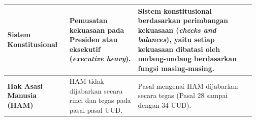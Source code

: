 \begin{table}[h!]
\begin{tabular}{|p{3cm}|p{6cm}|p{6cm}|}
\textbf{Sistem Konstitusional} & Pemusatan kekuasaan pada Presiden atau eksekutif (\textit{executive heavy}). & Sistem konstitusional berdasarkan perimbangan kekuasaan (\textit{checks and balances}), yaitu setiap kekuasaan dibatasi oleh undang-undang berdasarkan fungsi masing-masing. \\ \hline
\textbf{Hak Asasi Manusia (HAM)} & HAM tidak dijabarkan secara rinci dan tegas pada pasal-pasal UUD. & Pasal mengenai HAM dijabarkan secara tegas (Pasal 28 sampai dengan 34 UUD). \\ \hline
\end{tabular}
\end{table}